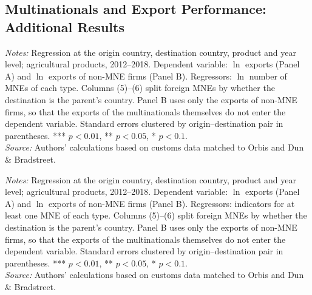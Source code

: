 \documentclass[11pt,a4paper]{article}
\newcommand{\srcnote}{\textit{Source:} Authors' calculations based on customs data matched to Orbis and Dun \& Bradstreet.}
\begin{document}
\subsection{Multinationals and Export Performance: Additional Results}
\begin{table}[H]\centering\small%
  \caption{Multinational Presence and Agricultural Exports, by Type of Multinational}%
  \label{tab:ap_counts}%
  \par\vspace{3pt}%
  \begin{minipage}{0.95\textwidth}\footnotesize %
  \textit{Notes:} Regression at the origin country, destination country, product and year level; agricultural products, 2012--2018. Dependent variable: $\ln$ exports (Panel A) and $\ln$ exports of non-MNE firms (Panel B). Regressors: $\ln$ number of MNEs of each type. Columns (5)--(6) split foreign MNEs by whether the destination is the parent's country. Panel B uses only the exports of non-MNE firms, so that the exports of the multinationals themselves do not enter the dependent variable. Standard errors clustered by origin--destination pair in parentheses. *** $p<0.01$, ** $p<0.05$, * $p<0.1$.\\[3pt]%
  \srcnote%
  \end{minipage}%
  \end{table}
\begin{table}[H]\centering\small%
  \caption{Multinational Presence and Agricultural Exports: Extensive Margin, by Type of Multinational}%
  \label{tab:ap_ext}%
  \par\vspace{3pt}%
  \begin{minipage}{0.95\textwidth}\footnotesize %
  \textit{Notes:} Regression at the origin country, destination country, product and year level; agricultural products, 2012--2018. Dependent variable: $\ln$ exports (Panel A) and $\ln$ exports of non-MNE firms (Panel B). Regressors: indicators for at least one MNE of each type. Columns (5)--(6) split foreign MNEs by whether the destination is the parent's country. Panel B uses only the exports of non-MNE firms, so that the exports of the multinationals themselves do not enter the dependent variable. Standard errors clustered by origin--destination pair in parentheses. *** $p<0.01$, ** $p<0.05$, * $p<0.1$.\\[3pt]%
  \srcnote%
  \end{minipage}%
  \end{table}
\end{document}
